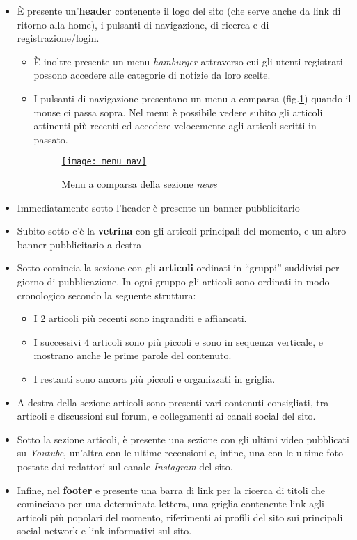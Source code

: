 \begin{itemize}
    \item È presente un'\textbf{header} contenente il logo del sito (che serve anche da link di ritorno alla home), i pulsanti di navigazione, di ricerca e di registrazione/login.
    \begin{itemize}
        \item È inoltre presente un menu \emph{hamburger} attraverso cui gli utenti registrati possono accedere alle categorie di notizie da loro scelte.
        \item I pulsanti di navigazione presentano un menu a comparsa (fig.\ref{fig:menu-nav}) quando il mouse ci passa sopra. Nel menu è possibile vedere subito gli articoli attinenti più recenti ed accedere velocemente agli articoli scritti in passato.
        \begin{figure}[h]
            \centering
            \href{pic/menu_nav.jpg}{\texttt{[image: menu\_nav]}}
            \caption{\href{pic/menu_nav.jpg}{Menu a comparsa della sezione \emph{news}}\label{fig:menu-nav}}
        \end{figure}
    \end{itemize}
    \item Immediatamente sotto l'header è presente un banner pubblicitario
    \item Subito sotto c'è la \textbf{vetrina} con gli articoli principali del momento, e un altro banner pubblicitario a destra
    \item Sotto comincia la sezione con gli \textbf{articoli} ordinati in ``gruppi'' suddivisi per giorno di pubblicazione. In ogni gruppo gli articoli sono ordinati in modo cronologico secondo la seguente struttura:
    \begin{itemize}
        \item I 2 articoli più recenti sono ingranditi e affiancati.
        \item I successivi 4 articoli sono più piccoli e sono in sequenza verticale, e mostrano anche le prime parole del contenuto.
        \item I restanti sono ancora più piccoli e organizzati in griglia.
    \end{itemize}
    \item A destra della sezione articoli sono presenti vari contenuti consigliati, tra articoli e discussioni sul forum, e collegamenti ai canali social del sito.
    \item Sotto la sezione articoli, è presente una sezione con gli ultimi video pubblicati su \emph{Youtube}, un'altra con le ultime recensioni e, infine, una con le ultime foto postate dai redattori sul canale \emph{Instagram} del sito.
    \item Infine, nel \textbf{footer} e presente una barra di link per la ricerca di titoli che cominciano per una determinata lettera, una griglia contenente link agli articoli più popolari del momento, riferimenti ai profili del sito sui principali social network e link informativi sul sito.
\end{itemize}

